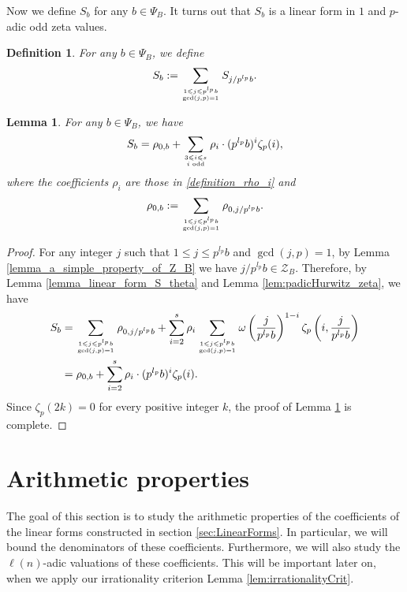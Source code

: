 \documentclass[12pt]{article}
\newtheorem{lemma}[theorem]{Lemma}
\newtheorem{definition}[theorem]{Definition}
\numberwithin{equation}{section}
\begin{document}
Now we define $S_b$ for any $b \in \Psi_B$. It turns out that $S_b$ is a linear form in $1$ and $p$-adic odd zeta values.

\begin{definition}\label{definition_linear_form_S_b}
For any $b \in \Psi_B$, we define
\[ S_b := \sum_{1 \leqslant j \leqslant p^{l_p}b \atop \gcd(j,p)=1} S_{j/p^{l_p}b}. \]
\end{definition}

\begin{lemma}\label{lemma_linear_form_S_b}
	For any $b \in \Psi_B$, we have
	\[ S_b = \rho_{0,b} + \sum_{3 \leqslant i \leqslant s \atop i \text{~odd}} \rho_i \cdot (p^{l_p}b)^{i} \zeta_p(i), \]
	where the coefficients $\rho_i$ are those in \eqref{definition_rho_i} and 
	\begin{equation}\label{definition_rho_0b}
		\rho_{0,b} := \sum_{1 \leqslant j \leqslant p^{l_p}b \atop \gcd(j,p)=1} \rho_{0,j/p^{l_p}b}.
	\end{equation}
\end{lemma}

\begin{proof}
For any integer $j$ such that $1 \leqslant j \leqslant p^{l_p}b$ and $\gcd(j,p)=1$, by Lemma \ref{lemma_a_simple_property_of_Z_B} we have $j/p^{l_p}b \in \mathcal{Z}_B$. Therefore, by Lemma \ref{lemma_linear_form_S_theta} and Lemma \ref{lem:padicHurwitz_zeta}, we have
\begin{align*}
 S_b &= \sum_{1 \leqslant j \leqslant p^{l_p}b \atop \gcd(j,p)=1} \rho_{0,j/p^{l_p}b} + \sum_{i=2}^{s} \rho_i \sum_{1 \leqslant j \leqslant p^{l_p}b \atop \gcd(j,p)=1} \omega\left(\frac{j}{p^{l_p}b}\right)^{1-i}\zeta_p\left(i,\frac{j}{p^{l_p}b}\right) \\
 &= \rho_{0,b} + \sum_{i=2}^{s} \rho_i \cdot (p^{l_p}b)^{i} \zeta_p(i).
\end{align*} 
Since $\zeta_p(2k)=0$ for every positive integer $k$, the proof of Lemma \ref{lemma_linear_form_S_b} is complete.
\end{proof}


\section{Arithmetic properties}\label{sec:Arithmetic}
The goal of this section is to study the arithmetic properties of the coefficients of the linear forms constructed in section \ref{sec:LinearForms}. In particular, we will bound the denominators of these coefficients. Furthermore, we will also study the $\ell(n)$-adic valuations of these coefficients. This will be important later on, when we apply our irrationality criterion Lemma \ref{lem:irrationalityCrit}.
\end{document}
